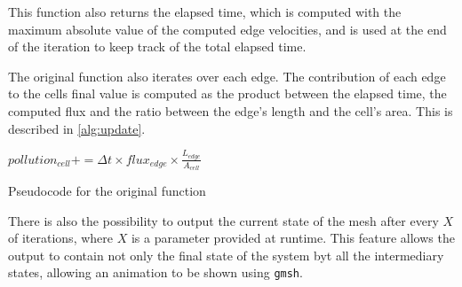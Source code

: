 This function also returns the elapsed time, which is computed with the maximum absolute value of the computed edge velocities, and is used at the end of the iteration to keep track of the total elapsed time.

The original \update function also iterates over each edge. The contribution of each edge to the cells final value is computed as the product between the elapsed time, the computed flux and the ratio between the edge's length and the cell's area. This is described in \cref{alg:update}.

\begin{algorithm}[!htp]
	\begin{algorithmic}

				$pollution_{cell} += \Delta{t} \times flux_{edge} \times \frac{L_{edge}}{A_{cell}}$
			\EndFor
		\EndFor
	\end{algorithmic}

	\caption{Pseudocode for the original \update function}
	\label{alg:update}
\end{algorithm}

There is also the possibility to output the current state of the mesh after every $X$ of iterations, where $X$ is a parameter provided at runtime. This feature allows the output to contain not only the final state of the system byt all the intermediary states, allowing  an animation to be shown using \texttt{gmsh}.


